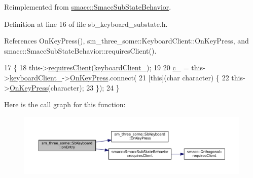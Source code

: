 Reimplemented from \hyperlink{classsmacc_1_1SmaccSubStateBehavior_a47eb8983afa8e1d312873a9a297b84f3}{smacc\+::\+Smacc\+Sub\+State\+Behavior}.



Definition at line 16 of file sb\+\_\+keyboard\+\_\+substate.\+h.



References On\+Key\+Press(), sm\+\_\+three\+\_\+some\+::\+Keyboard\+Client\+::\+On\+Key\+Press, and smacc\+::\+Smacc\+Sub\+State\+Behavior\+::requires\+Client().


\begin{DoxyCode}
17         \{
18                 this->\hyperlink{classsmacc_1_1SmaccSubStateBehavior_ae8361a9e794b02f9f3d962b881e4fd7d}{requiresClient}(\hyperlink{classsm__three__some_1_1SbKeyboard_a9db2d2dd752cca859c1aa71c665991a8}{keyboardClient\_});
19 
20                 \hyperlink{classsm__three__some_1_1SbKeyboard_a3b384b219aad93ff23a9bcdb5cab5a80}{c\_} = this->\hyperlink{classsm__three__some_1_1SbKeyboard_a9db2d2dd752cca859c1aa71c665991a8}{keyboardClient\_}->\hyperlink{classsm__three__some_1_1KeyboardClient_a96b6b8220c64a1e33480d5ac75c3b8e0}{OnKeyPress}.connect(
21                     [\textcolor{keyword}{this}](\textcolor{keywordtype}{char} character) \{
22                             this->\hyperlink{classsm__three__some_1_1SbKeyboard_a486cad3628282fc8414afff3d3c6e2dc}{OnKeyPress}(character);
23                     \});
24         \}
\end{DoxyCode}


Here is the call graph for this function\+:
\nopagebreak
\begin{figure}[H]
\begin{center}
\leavevmode
\includegraphics[width=350pt]{classsm__three__some_1_1SbKeyboard_a1ff464d5b807b874f2936fb93871f872_cgraph}
\end{center}
\end{figure}


